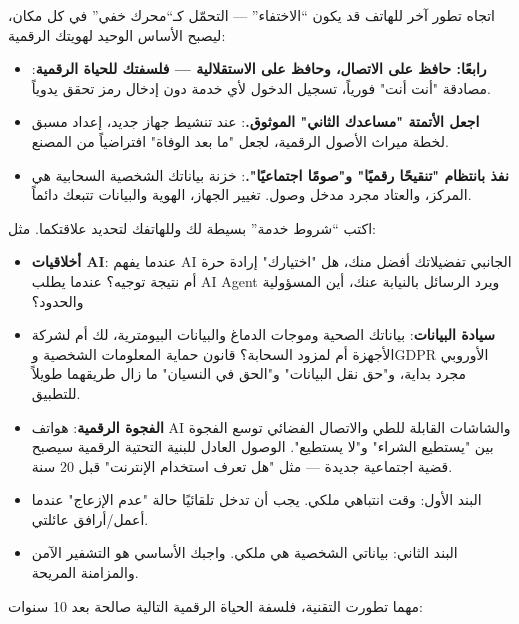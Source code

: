 
اتجاه تطور آخر للهاتف قد يكون “الاختفاء” — التحمّل كـ“محرك خفي” في كل مكان، ليصبح الأساس الوحيد لهويتك الرقمية:

\begin{itemize}
  \item \textbf{رابعًا: حافظ على الاتصال، وحافظ على الاستقلالية — فلسفتك للحياة الرقمية}: مصادقة "أنت أنت" فورياً، تسجيل الدخول لأي خدمة دون إدخال رمز تحقق يدوياً.
  \item \textbf{اجعل الأتمتة "مساعدك الثاني" الموثوق.}: عند تنشيط جهاز جديد، إعداد مسبق لخطة ميراث الأصول الرقمية، لجعل "ما بعد الوفاة" افتراضياً من المصنع.
  \item \textbf{نفذ بانتظام "تنقيحًا رقميًا" و"صومًا اجتماعيًا".}: خزنة بياناتك الشخصية السحابية هي المركز، والعتاد مجرد مدخل وصول. تغيير الجهاز، الهوية والبيانات تتبعك دائماً.
\end{itemize}


اكتب “شروط خدمة” بسيطة لك وللهاتفك لتحديد علاقتكما. مثل:

\begin{itemize}
  \item \textbf{أخلاقيات AI}: عندما يفهم AI الجانبي تفضيلاتك أفضل منك، هل "اختيارك" إرادة حرة أم نتيجة توجيه؟ عندما يطلب AI Agent ويرد الرسائل بالنيابة عنك، أين المسؤولية والحدود؟
  \item \textbf{سيادة البيانات}: بياناتك الصحية وموجات الدماغ والبيانات البيومترية، لك أم لشركة الأجهزة أم لمزود السحابة؟ قانون حماية المعلومات الشخصية وGDPR الأوروبي مجرد بداية، و"حق نقل البيانات" و"الحق في النسيان" ما زال طريقهما طويلاً للتطبيق.
  \item \textbf{الفجوة الرقمية}: هواتف AI والشاشات القابلة للطي والاتصال الفضائي توسع الفجوة بين "يستطيع الشراء" و"لا يستطيع". الوصول العادل للبنية التحتية الرقمية سيصبح قضية اجتماعية جديدة — مثل "هل تعرف استخدام الإنترنت" قبل 20 سنة.
  \item البند الأول: وقت انتباهي ملكي. يجب أن تدخل تلقائيًا حالة "عدم الإزعاج" عندما أعمل/أرافق عائلتي.
  \item البند الثاني: بياناتي الشخصية هي ملكي. واجبك الأساسي هو التشفير الآمن والمزامنة المريحة.
\end{itemize}


مهما تطورت التقنية، فلسفة الحياة الرقمية التالية صالحة بعد 10 سنوات:

